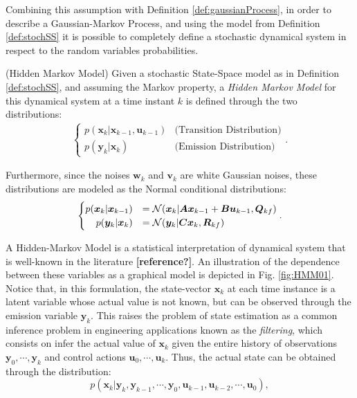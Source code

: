 \documentclass[a4paper,11pt]{book}
\numberwithin{figure}{chapter}
\numberwithin{equation}{chapter}
\numberwithin{table}{chapter}
\theoremstyle{definition}
\newtheorem{definition}{Definition}[chapter]
\newcounter{boxed-theorem}
\newcounter{boxed-definition}
\newenvironment{boxed-definition}[1]
{\colorlet{shadecolor}{pastelYellow!15} \begin{shaded} \begin{definition}{#1}}
{\end{definition} \end{shaded}}
\newcounter{boxed-example}
\begin{document}
Combining this assumption with Definition \ref{def:gaussianProcess}, in order to describe a Gaussian-Markov Process, and using the model from Definition \ref{def:stochSS} it is possible to completely define a stochastic dynamical system in respect to the random variables probabilities.

\begin{boxed-definition}{(Hidden Markov Model)} \label{def:HMM}
    Given a stochastic State-Space model as in Definition \ref{def:stochSS}, and assuming the Markov property, a \textit{Hidden Markov Model} for this dynamical system at a time instant $k$ is defined through the two distributions:
    \begin{align}
    \begin{cases}
        p(\bm{x}_{k} | \bm{x}_{k-1}, \bm{u}_{k-1}) & \text{(Transition Distribution)} \\
        p(\bm{y}_{k} | \bm{x}_{k}) & \text{(Emission Distribution)}
    \end{cases}
    .\end{align}
    
    Furthermore, since the noises $\bm{w}_k$ and $\bm{v}_k$ are white Gaussian noises, these distributions are modeled as the Normal conditional distributions:
    \begin{align}
    \begin{cases}
        p(\bm{x}_{k} | \bm{x}_{k-1}) &= \mathcal{N}(\bm{x}_k | \bm{A}\bm{x}_{k-1} + \bm{B}\bm{u}_{k-1}, \bm{Q}_{kf}) \\
        \hfill p(\bm{y}_{k} | \bm{x}_{k}) &= \mathcal{N}(\bm{y}_k | \bm{C}\bm{x}_{k}, \bm{R}_{kf})
    \end{cases}
    .\end{align}
\end{boxed-definition}

A Hidden-Markov Model is a statistical interpretation of dynamical system that is well-known in the literature \textbf{[reference?]}. An illustration of the dependence between these variables as a graphical model is depicted in Fig. \ref{fig:HMM01}. Notice that, in this formulation, the state-vector $\bm{x}_k$ at each time instance is a latent variable whose actual value is not known, but can be observed through the emission variable $\bm{y}_k$. This raises the problem of state estimation as a common inference problem in engineering applications known as the \textit{filtering}, which consists on infer the actual value of $\bm{x}_k$ given the entire history of observations $\bm{y}_0, \cdots, \bm{y}_k$ and control actions $\bm{u}_0, \cdots, \bm{u}_k$. Thus, the actual state can be obtained through the distribution:
\begin{equation}
    p(\bm{x}_k | \bm{y}_{k}, \bm{y}_{k-1}, \cdots, \bm{y}_0, \bm{u}_{k-1}, \bm{u}_{k-2}, \cdots, \bm{u}_0)
,\end{equation}
\end{document}

